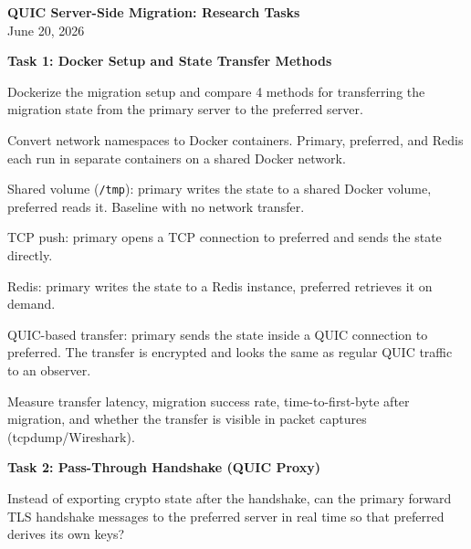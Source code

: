 \documentclass[11pt]{article}
\begin{document}
\begin{center}
{\large\bfseries QUIC Server-Side Migration: Research Tasks}\\[4pt]
June 20, 2026
\end{center}

\bigskip

\textbf{Task 1: Docker Setup and State Transfer Methods}

Dockerize the migration setup and compare 4 methods for transferring the migration state from the primary server to the preferred server.

\begin{tasklist}
\item[1a.] Convert network namespaces to Docker containers. Primary, preferred, and Redis each run in separate containers on a shared Docker network.
\item[1b.] Shared volume (\texttt{/tmp}): primary writes the state to a shared Docker volume, preferred reads it. Baseline with no network transfer.
\item[1c.] TCP push: primary opens a TCP connection to preferred and sends the state directly.
\item[1d.] Redis: primary writes the state to a Redis instance, preferred retrieves it on demand.
\item[1e.] QUIC-based transfer: primary sends the state inside a QUIC connection to preferred. The transfer is encrypted and looks the same as regular QUIC traffic to an observer.
\item[1f.] Measure transfer latency, migration success rate, time-to-first-byte after migration, and whether the transfer is visible in packet captures (tcpdump/Wireshark).
\end{tasklist}

\bigskip
\textbf{Task 2: Pass-Through Handshake (QUIC Proxy)}

Instead of exporting crypto state after the handshake, can the primary forward TLS handshake messages to the preferred server in real time so that preferred derives its own keys?
\end{document}

